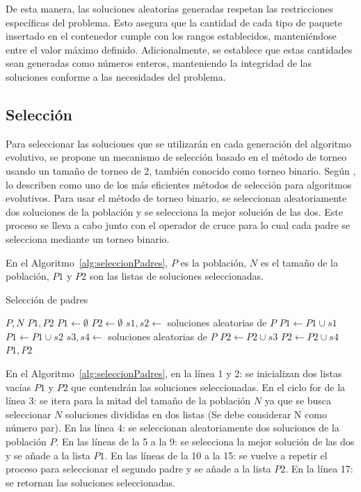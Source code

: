 \documentclass[openany]{article}
\begin{document}
De esta manera, las soluciones aleatorias generadas respetan las restricciones específicas del problema. Esto asegura que la cantidad de cada tipo de paquete insertado en el contenedor cumple con los rangos establecidos, manteniéndose entre el valor máximo definido. Adicionalmente, se establece que estas cantidades sean generadas como números enteros, manteniendo la integridad de las soluciones conforme a las necesidades del problema.

\subsection{Selección}

Para seleccionar las soluciones que se utilizarán en cada generación del algoritmo evolutivo, se propone un mecanismo de selección basado en el método de torneo usando un tamaño de torneo de 2, también conocido como torneo binario. Según \textcite{Anand2015ANA}, lo describen como uno de los más eficientes métodos de selección para algoritmos evolutivos. Para usar el método de torneo binario, se seleccionan aleatoriamente dos soluciones de la población y se selecciona la mejor solución de las dos. Este proceso se lleva a cabo junto con el operador de cruce para lo cual cada padre se selecciona mediante un torneo binario.

En el Algoritmo~\ref{alg:seleccionPadres}, $P$ es la población, $N$ es el tamaño de la población, $P1$ y $P2$ son las listas de soluciones seleccionadas.

\begin{algorithm}[H]
    \caption{Selección de padres}\label{alg:seleccionPadres}
    \begin{algorithmic}[1]
        \Require $P, N$
        \Ensure $P1, P2$
        \State $P1 \leftarrow \emptyset$
        \State $P2 \leftarrow \emptyset$
        \State $s1, s2 \leftarrow$ soluciones aleatorias de $P$
        \State $P1 \leftarrow P1 \cup s1$
        \Else
        \State $P1 \leftarrow P1 \cup s2$
        \EndIf
        \State $s3, s4 \leftarrow$ soluciones aleatorias de $P$
        \State $P2 \leftarrow P2 \cup s3$
        \Else
        \State $P2 \leftarrow P2 \cup s4$
        \EndIf
        \EndFor
        \State \Return $P1, P2$
    \end{algorithmic}
\end{algorithm}

En el Algoritmo~\ref{alg:seleccionPadres}, en la línea 1 y 2: se inicializan dos listas vacías $P1$ y $P2$ que contendrán las soluciones seleccionadas. En el ciclo for de la línea 3: se itera para la mitad del tamaño de la población $N$ ya que se busca seleccionar $N$ soluciones divididas en dos listas (Se debe considerar N como número par). En las línea 4: se seleccionan aleatoriamente dos soluciones de la población $P$. En las líneas de la 5 a la 9: se selecciona la mejor solución de las dos y se añade a la lista $P1$. En las líneas de la 10 a la 15: se vuelve a repetir el proceso para seleccionar el segundo padre y se añade a la lista $P2$. En la línea 17: se retornan las soluciones seleccionadas.
\end{document}
